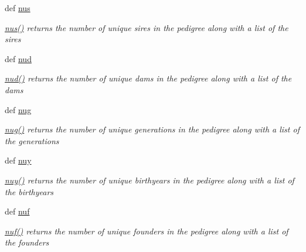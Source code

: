 \begin{DoxyCompactItemize}
def \hyperlink{classPyPedal_1_1pyp__classes_1_1Pedigree_ad89f110b30544721eeaa945e50f467ff}{nus}
\begin{DoxyCompactList}\small\item\em \hyperlink{classPyPedal_1_1pyp__classes_1_1Pedigree_ad89f110b30544721eeaa945e50f467ff}{nus()} returns the number of unique sires in the pedigree along with a list of the sires \end{DoxyCompactList}\item 
def \hyperlink{classPyPedal_1_1pyp__classes_1_1Pedigree_a5da0b261e57cab87dd06af5e07aeb55e}{nud}
\begin{DoxyCompactList}\small\item\em \hyperlink{classPyPedal_1_1pyp__classes_1_1Pedigree_a5da0b261e57cab87dd06af5e07aeb55e}{nud()} returns the number of unique dams in the pedigree along with a list of the dams \end{DoxyCompactList}\item 
def \hyperlink{classPyPedal_1_1pyp__classes_1_1Pedigree_acc0248a985179c7c58a41d71b4e11799}{nug}
\begin{DoxyCompactList}\small\item\em \hyperlink{classPyPedal_1_1pyp__classes_1_1Pedigree_acc0248a985179c7c58a41d71b4e11799}{nug()} returns the number of unique generations in the pedigree along with a list of the generations \end{DoxyCompactList}\item 
def \hyperlink{classPyPedal_1_1pyp__classes_1_1Pedigree_a350271baa0007e5c9e0fd5652f29c399}{nuy}
\begin{DoxyCompactList}\small\item\em \hyperlink{classPyPedal_1_1pyp__classes_1_1Pedigree_a350271baa0007e5c9e0fd5652f29c399}{nuy()} returns the number of unique birthyears in the pedigree along with a list of the birthyears \end{DoxyCompactList}\item 
def \hyperlink{classPyPedal_1_1pyp__classes_1_1Pedigree_a3b7ebee81bdb56eb9343795e2faa9611}{nuf}
\begin{DoxyCompactList}\small\item\em \hyperlink{classPyPedal_1_1pyp__classes_1_1Pedigree_a3b7ebee81bdb56eb9343795e2faa9611}{nuf()} returns the number of unique founders in the pedigree along with a list of the founders \end{DoxyCompactList}\end{DoxyCompactItemize}
